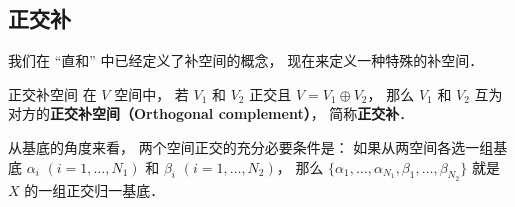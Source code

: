 \subsection{正交补}
我们在 “直和” 中已经定义了补空间的概念， 现在来定义一种特殊的补空间．
\begin{definition}{正交补空间}\label{OrthSp_def1}
在 $V$ 空间中， 若 $V_1$ 和 $V_2$ 正交且 $V = V_1 \oplus V_2$， 那么 $V_1$ 和 $V_2$ 互为对方的\textbf{正交补空间（Orthogonal complement）}， 简称\textbf{正交补}．
\end{definition}

\begin{theorem}{}\label{OrthSp_the1}
从基底的角度来看， 两个空间正交的充分必要条件是： 如果从两空间各选一组基底 ${\alpha_i}$ $(i = 1, \dots, N_1)$ 和 ${\beta_i}$ $(i = 1, \dots, N_2)$， 那么 $\{\alpha_1, \dots, \alpha_{N_1}, \beta_1, \dots, \beta_{N_2}\}$ 就是 $X$ 的一组正交归一基底．
\end{theorem}

